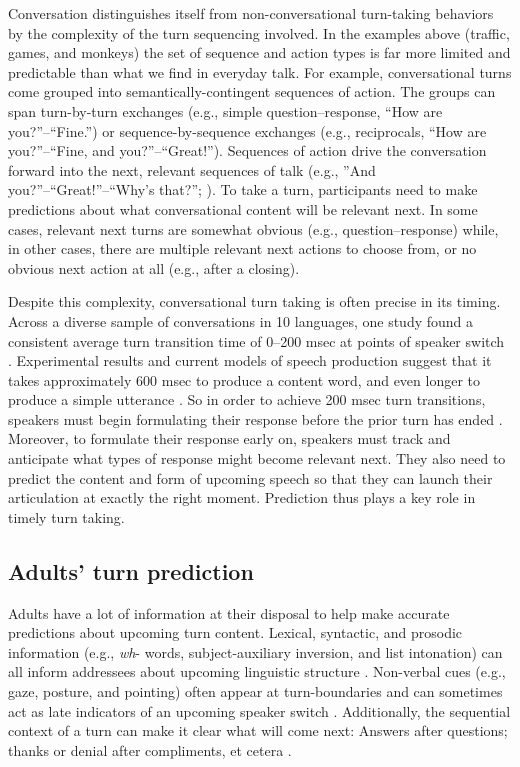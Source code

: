 \documentclass[authoryear, 12pt]{elsarticle}
\begin{document}
Conversation distinguishes itself from non-conversational turn-taking behaviors by the complexity of the turn sequencing involved. In the examples above (traffic, games, and monkeys) the set of sequence and action types is far more limited and predictable than what we find in everyday talk. For example, conversational turns come grouped into semantically-contingent sequences of action. The groups can span turn-by-turn exchanges (e.g., simple question--response, ``How are you?''--``Fine.'') or sequence-by-sequence exchanges (e.g., reciprocals, ``How are you?''--``Fine, and you?''--``Great!''). Sequences of action drive the conversation forward into the next, relevant sequences of talk (e.g., ''And you?''--``Great!''--``Why's that?''; \citealp{schegloff2007}). To take a turn, participants need to make predictions about what conversational content will be relevant next. In some cases, relevant next turns are somewhat obvious (e.g., question--response) while, in other cases, there are multiple relevant next actions to choose from, or no obvious next action at all (e.g., after a closing).

Despite this complexity, conversational turn taking is often precise in its timing. Across a diverse sample of conversations in 10 languages, one study found a consistent average turn transition time of 0--200 msec at points of speaker switch \citep{stivers2009}. Experimental results and current models of speech production suggest that it takes approximately 600 msec to produce a content word, and even longer to produce a simple utterance \citep{griffin2000, levelt1989}. So in order to achieve 200 msec turn transitions, speakers must begin formulating their response before the prior turn has ended \citep{levinson2013}. Moreover, to formulate their response early on, speakers must track and anticipate what types of response might become relevant next. They also need to predict the content and form of upcoming speech so that they can launch their articulation at exactly the right moment. Prediction thus plays a key role in timely turn taking.

\subsection{Adults' turn prediction}

Adults have a lot of information at their disposal to help make accurate predictions about upcoming turn content. Lexical, syntactic, and prosodic information (e.g., \textit{wh}- words, subject-auxiliary inversion, and list intonation) can all inform addressees about upcoming linguistic structure \citep{de-ruiter2006, duncan1972, ford1996, torreira2015}. Non-verbal cues (e.g., gaze, posture, and pointing) often appear at turn-boundaries and can sometimes act as late indicators of an upcoming speaker switch \citep{rossano2009, stivers2010}. Additionally, the sequential context of a turn can make it clear what will come next: Answers after questions; thanks or denial after compliments, et cetera \citep{schegloff2007}.
\end{document}
